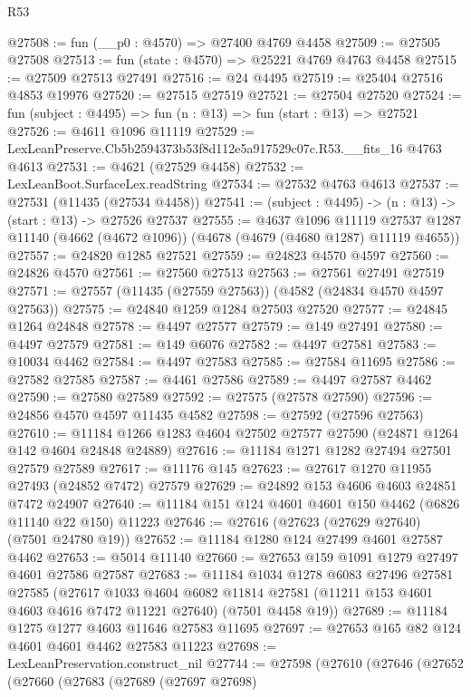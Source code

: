 \begin{lexlean}{R53}
\begin{coremodule}
@27508 := fun (__p0 : @4570) => @27400 @4769 @4458
@27509 := @27505 @27508
@27513 := fun (state : @4570) => @25221 @4769 @4763 @4458
@27515 := @27509 @27513 @27491
@27516 := @24 @4495
@27519 := @25404 @27516 @4853 @19976
@27520 := @27515 @27519
@27521 := @27504 @27520
@27524 := fun (subject : @4495) => fun (n : @13) => fun (start : @13) => @27521
@27526 := @4611 @1096 @11119
@27529 := LexLeanPreserve.Cb5b2594373b53f8d112e5a917529c07c.R53.__fits_16 @4763 @4613
@27531 := @4621 (@27529 @4458)
@27532 := LexLeanBoot.SurfaceLex.readString
@27534 := @27532 @4763 @4613
@27537 := @27531 (@11435 (@27534 @4458))
@27541 := (subject : @4495) -> (n : @13) -> (start : @13) -> @27526 @27537
@27555 := @4637
    @1096
    @11119
    @27537
    @1287
    @11140
    (@4662 (@4672 @1096))
    (@4678 (@4679 (@4680 @1287) @11119 @4655))
@27557 := @24820 @1285 @27521
@27559 := @24823 @4570 @4597
@27560 := @24826 @4570
@27561 := @27560 @27513
@27563 := @27561 @27491 @27519
@27571 := @27557 (@11435 (@27559 @27563)) (@4582 (@24834 @4570 @4597 @27563))
@27575 := @24840 @1259 @1284 @27503 @27520
@27577 := @24845 @1264 @24848
@27578 := @4497 @27577
@27579 := @149 @27491
@27580 := @4497 @27579
@27581 := @149 @6076
@27582 := @4497 @27581
@27583 := @10034 @4462
@27584 := @4497 @27583
@27585 := @27584 @11695
@27586 := @27582 @27585
@27587 := @4461 @27586
@27589 := @4497 @27587 @4462
@27590 := @27580 @27589
@27592 := @27575 (@27578 @27590)
@27596 := @24856 @4570 @4597 @11435 @4582
@27598 := @27592 (@27596 @27563)
@27610 := @11184 @1266 @1283 @4604 @27502 @27577 @27590 (@24871 @1264 @142 @4604 @24848 @24889)
@27616 := @11184 @1271 @1282 @27494 @27501 @27579 @27589
@27617 := @11176 @145
@27623 := @27617 @1270 @11955 @27493 (@24852 @7472) @27579
@27629 := @24892 @153 @4606 @4603 @24851 @7472 @24907
@27640 := @11184 @151 @124 @4601 @4601 @150 @4462 (@6826 @11140 @22 @150) @11223
@27646 := @27616 (@27623 (@27629 @27640) (@7501 @24780 @19))
@27652 := @11184 @1280 @124 @27499 @4601 @27587 @4462
@27653 := @5014 @11140
@27660 := @27653 @159 @1091 @1279 @27497 @4601 @27586 @27587
@27683 := @11184
    @1034
    @1278
    @6083
    @27496
    @27581
    @27585
    (@27617
      @1033
      @4604
      @6082
      @11814
      @27581
      (@11211 @153 @4601 @4603 @4616 @7472 @11221 @27640)
      (@7501 @4458 @19))
@27689 := @11184 @1275 @1277 @4603 @11646 @27583 @11695
@27697 := @27653 @165 @82 @124 @4601 @4601 @4462 @27583 @11223
@27698 := LexLeanPreservation.construct_nil
@27744 := @27598
    (@27610
      (@27646
        (@27652
          (@27660
            (@27683
              (@27689
                (@27697 @27698)

\end{coremodule}
\end{lexlean}
